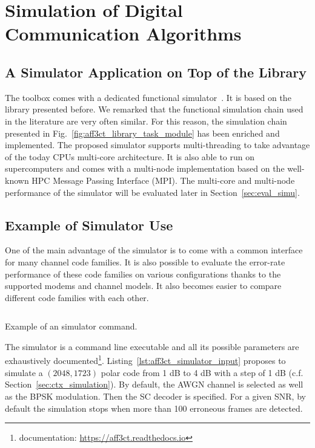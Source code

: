 \section{Simulation of Digital Communication Algorithms}

\subsection{A Simulator Application on Top of the Library}

The \AFFECT toolbox comes with a dedicated functional
simulator~\cite{Cassagne2017}. It is based on the \AFFECT library presented
before. We remarked that the functional simulation chain used in the literature
are very often similar. For this reason, the simulation chain presented in
Fig.~\ref{fig:aff3ct_library_task_module} has been enriched and implemented. The
proposed simulator supports multi-threading to take advantage of the today CPUs
multi-core architecture. It is also able to run on supercomputers and comes with
a multi-node implementation based on the well-known HPC Message Passing
Interface (MPI). The multi-core and multi-node performance of the \AFFECT
simulator will be evaluated later in Section~\ref{sec:eval_simu}.

\subsection{Example of Simulator Use}
\label{sec:aff3ct_simulator_example}

One of the main advantage of the \AFFECT simulator is to come with a common
interface for many channel code families. It is also possible to evaluate the
error-rate performance of these code families on various configurations thanks
to the supported modems and channel models. It also becomes easier to compare
different code families with each other.

\begin{listing}[htp]
  \inputminted[frame=lines]{bash}{\curChapter/src/use_cases/simulator/input.txt}
  \caption{Example of an \AFFECT simulator command.}
  \label{lst:aff3ct_simulator_input}
\end{listing}

The \AFFECT simulator is a command line executable and all its possible
parameters are exhaustively documented\footnote{\AFFECT documentation:
\url{https://aff3ct.readthedocs.io}}. Listing~\ref{lst:aff3ct_simulator_input}
proposes to simulate a $(2048,1723)$ polar code from 1 dB to 4 dB with a step of
1 dB (c.f. Section~\ref{sec:ctx_simulation}). By default, the AWGN channel is
selected as well as the BPSK modulation. Then the SC decoder is specified. For a
given SNR, by default the simulation stops when more than 100 erroneous frames
are detected.

